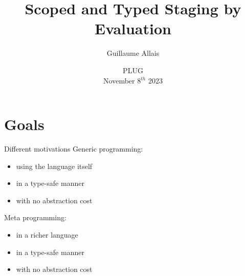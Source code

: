 \documentclass{beamer}
\title{Scoped and Typed Staging by Evaluation}
\author{Guillaume Allais}
\institute{University of Strathclyde}
\date{PLUG \\ November 8$^{th}$ 2023}
\begin{document}
\begin{frame}
  \maketitle
\end{frame}

\section{Goals}

\begin{frame}{Different motivations}
Generic programming:

\begin{itemize}
  \item using the language itself
  \item in a type-safe manner
  \item with no abstraction cost
\end{itemize}

\bigskip

Meta programming:

\begin{itemize}
  \item in a richer language
  \item in a type-safe manner
  \item with no abstraction cost
\end{itemize}
\end{frame}
\end{document}
